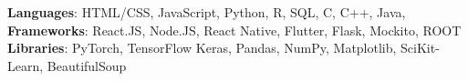    \begin{itemize}[leftmargin=0.15in, label={}] 
    \small{\item{
      \textbf{Languages}: HTML/CSS, JavaScript, Python, R, SQL, C, C++, Java, \\
      \textbf{Frameworks}: React.JS, Node.JS, React Native, Flutter, Flask, Mockito, ROOT  \\
      \textbf{Libraries}: PyTorch, TensorFlow Keras, Pandas, NumPy, Matplotlib, SciKit-Learn, BeautifulSoup
       }}
\end{itemize}